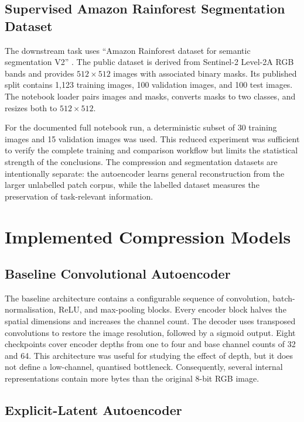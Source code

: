 \documentclass[10pt,a4paper]{article}
\begin{document}
\subsection{Supervised Amazon Rainforest Segmentation Dataset}

The downstream task uses ``Amazon Rainforest dataset for semantic segmentation
V2'' \cite{bragagnolo2020}. The public dataset is derived from Sentinel-2
Level-2A RGB bands and provides \(512\times512\) images with associated binary
masks. Its published split contains 1,123 training images, 100 validation
images, and 100 test images. The notebook loader pairs images and masks,
converts masks to two classes, and resizes both to \(512\times512\).

For the documented full notebook run, a deterministic subset of 30 training
images and 15 validation images was used. This reduced experiment was
sufficient to verify the complete training and comparison workflow but limits
the statistical strength of the conclusions. The compression and segmentation
datasets are intentionally separate: the autoencoder learns general
reconstruction from the larger unlabelled patch corpus, while the labelled
dataset measures the preservation of task-relevant information.

\section{Implemented Compression Models}

\subsection{Baseline Convolutional Autoencoder}

The baseline architecture contains a configurable sequence of convolution,
batch-normalisation, ReLU, and max-pooling blocks. Every encoder block halves
the spatial dimensions and increases the channel count. The decoder uses
transposed convolutions to restore the image resolution, followed by a sigmoid
output. Eight checkpoints cover encoder depths from one to four and base
channel counts of 32 and 64. This architecture was useful for studying the
effect of depth, but it does not define a low-channel, quantised bottleneck.
Consequently, several internal representations contain more bytes than the
original 8-bit RGB image.

\subsection{Explicit-Latent Autoencoder}
\end{document}
